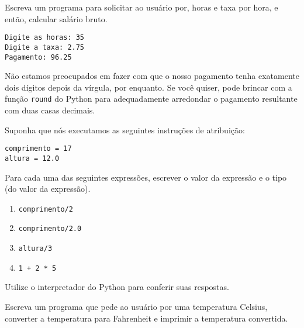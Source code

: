 \begin{ex}
Escreva um programa para solicitar ao usuário por, horas e taxa por hora, e então, calcular 
salário bruto.
\begin{verbatim}
Digite as horas: 35
Digite a taxa: 2.75
Pagamento: 96.25
\end{verbatim}
\end{ex}
%
Não estamos preocupados em fazer com que o nosso pagamento tenha exatamente dois dígitos depois 
da vírgula, por enquanto. Se você quiser, pode brincar com a função {\tt round} do Python para 
adequadamente arredondar o pagamento resultante com duas casas decimais.

\begin{ex}
Suponha que nós executamos as seguintes instruções de atribuição:

\begin{verbatim}
comprimento = 17
altura = 12.0
\end{verbatim}

Para cada uma das seguintes expressões, escrever o valor da 
expressão e o tipo (do valor da expressão).

\begin{enumerate}

\item {\tt comprimento/2}

\item {\tt comprimento/2.0}

\item {\tt altura/3}

\item {\tt 1 + 2 * 5}

\end{enumerate}

Utilize o interpretador do Python para conferir suas respostas.
\end{ex}

\begin{ex}
Escreva um programa que pede ao usuário por uma temperatura Celsius, 
converter a temperatura para Fahrenheit e imprimir a temperatura 
convertida.

\end{ex}